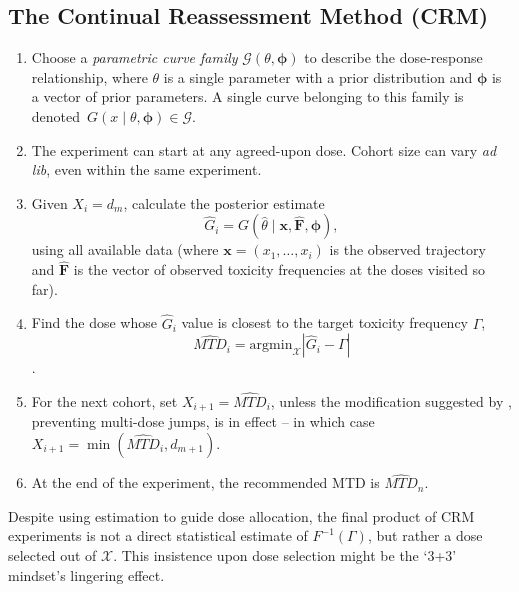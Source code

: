 \subsection{The Continual Reassessment Method (CRM)}
\begin{enumerate}
\item Choose a \emph{parametric curve family} $\mathcal{G}\left(\theta,\boldsymbol{\phi}\right)$ to describe the dose-response relationship, where $\theta$ is a single parameter with a prior distribution and $\boldsymbol{\phi}$ is a vector of prior parameters. A single curve belonging to this family is denoted\ $G\left(x\mid\theta,\boldsymbol{\phi}\right)\in\mathcal{G}$.
\item The experiment can start at any agreed-upon dose. Cohort size can vary \emph{ad lib}, even within the same experiment.
\item Given $X_i=d_m$, calculate the posterior estimate
$$\hat{G}_i=G\left(\hat{\theta}\mid \mathbf{x,\hat{F}},\boldsymbol{\phi}\right),$$
using all available data (where  $\mathbf{x}=\left(x_1,\ldots ,x_i\right)$ is the observed trajectory and $\mathbf{\hat{F}}$ is the vector of observed toxicity frequencies at the doses visited so far).
\item Find the dose whose $\hat{G}_i$ value is closest to the target toxicity frequency $\Gamma$, $$\widehat{MTD}_i=\mathrm{arg min}_{\mathcal{X}}\left|\hat{G}_i-\Gamma\right|$$.
\item For the next cohort, set $X_{i+1}=\widehat{MTD}_i$, unless the modification suggested by \cite{Good:Zahu:Pian:some:1995}, preventing multi-dose jumps, is in effect -- in which case $X_{i+1}=\min\left(\widehat{MTD}_i,d_{m+1}\right)$.
\item At the end of the experiment, the recommended MTD is $\widehat{MTD}_n$.
\end{enumerate}

\noindent Despite using estimation to guide dose allocation, the final product of CRM experiments is not a direct statistical estimate of $F^{-1}(\Gamma)$, but rather a dose selected out of $\mathcal{X}$. This insistence upon dose selection might be the `3+3' mindset's lingering effect.

